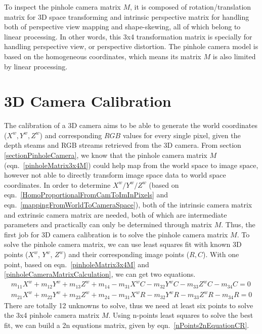 To inspect the pinhole camera matrix \(M\), it is composed of rotation/translation matrix for 3D space transforming and intrinsic perspective matrix for handling both of perspective view mapping and shape-skewing, all of which belong to linear processing. In other words, this 3x4 transformation matrix is specially for handling perspective view, or perspective distortion. The pinhole camera model is based on the homogeneous coordinates, which means its matrix \(M\) is also limited by linear processing.
   
\section{3D Camera Calibration}
\label{section3DcameraCalibration}
\indent
The calibration of a 3D camera aims to be able to generate the world coordinates (\(X^w, Y^w, Z^w\)) and corresponding \(RGB\) values for every single pixel, given the depth steams and RGB streams retrieved from the 3D camera. From section \ref{sectionPinholeCamera}, we know that the pinhole camera matrix \(M\) (eqn.~\ref{pinholeMatrix3x4M}) could help map from the world space to image space, however not able to directly transform image space data to world space coordinates. In order to determine \(X^w/Y^w/Z^w\) (based on eqn.~\ref{HomoProportionalFromCamToImInPixels} and eqn.~\ref{mappingFromWorldToCameraSpace}), both of the intrinsic camera matrix and extrinsic camera matrix are needed, both of which are intermediate parameters and practically can only be determined through matrix \(M\). Thus, the first job for 3D camera calibration is to solve the pinhole camera matrix \(M\). To solve the pinhole camera matrix, we can use least squares fit with known 3D points (\(X^w\), \(Y^w\), \(Z^w\)) and their corresponding image points (\(R, C\)). With one point, based on eqn.~\ref{pinholeMatrix3x4M} and \ref{pinholeCameraMatrixCalculation}, we can get two equations.
\begin{equation}
\begin{aligned}
m_{11}X^w + m_{12}Y^w + m_{13}Z^w + m_{14} - m_{31}X^wC - m_{32}Y^wC - m_{33}Z^wC - m_{34}C = 0%
\\%
m_{21}X^w + m_{22}Y^w + m_{23}Z^w + m_{24} - m_{31}X^wR - m_{32}Y^wR - m_{33}Z^wR - m_{34}R = 0
\end{aligned}
\label{onePointEquationCR}
\end{equation}%
\noindent
There are totally 12 unknowns to solve, thus we need at least six points to solve the 3x4 pinhole camera matrix \(M\). Using n-points least squares to solve the best fit, we can build a 2n equations matrix, given by eqn.~\ref{nPoints2nEquationCR}.

